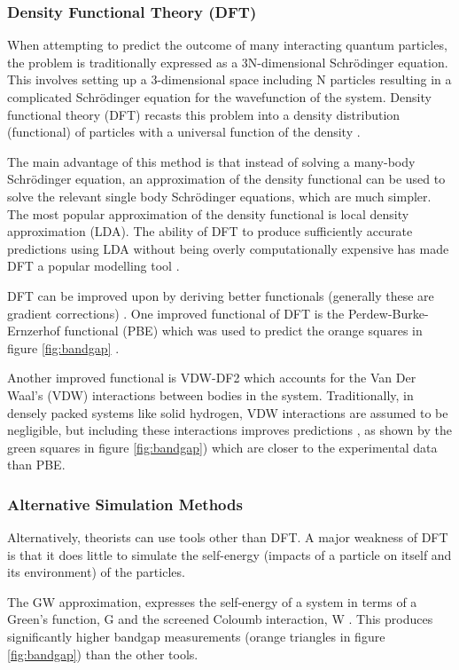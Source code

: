 \documentclass[esp]{FCEFyN-class}
\begin{document}
\subsubsection*{Density Functional Theory (DFT)}

When attempting to predict the outcome of many interacting quantum particles, the problem is traditionally expressed as a 3N-dimensional Schrödinger equation. This involves setting up a 3-dimensional space including N particles resulting in a complicated Schrödinger equation for the wavefunction of the system. Density functional theory (DFT) recasts this problem into a density distribution (functional) of particles with a universal function of the density \cite{Gross2013}.

The main advantage of this method is that instead of solving a many-body Schrödinger equation, an approximation of the density functional can be used to solve the relevant single body Schrödinger equations, which are much simpler. The most popular approximation of the density functional is local density approximation (LDA). The ability of DFT to produce sufficiently accurate predictions using LDA without being overly computationally expensive has made DFT a popular modelling tool \cite{Gross2013}.

DFT can be improved upon by deriving better functionals (generally these are gradient corrections) \cite{Aryasetiawan1998}. One improved functional of DFT is the Perdew-Burke-Ernzerhof functional (PBE) which was used to predict the orange squares in figure \ref{fig:bandgap}  \cite{Bagayoko2014}.

Another improved functional is VDW-DF2 which accounts for the Van Der Waal’s (VDW) interactions between bodies in the system. Traditionally, in densely packed systems like solid hydrogen, VDW interactions are assumed to be negligible, but including these interactions improves predictions \cite{Lee2010} \cite{Berland2015}, as shown by the green squares in figure \ref{fig:bandgap}) which are closer to the experimental data than PBE.


\subsubsection*{Alternative Simulation Methods}
Alternatively, theorists can use tools other than DFT. A major weakness of DFT is that it does little to simulate the self-energy (impacts of a particle on itself and its environment) of the particles. 

The GW approximation, expresses the self-energy of a system in terms of a Green's function, G and the screened Coloumb interaction, W \cite{Aryasetiawan1998}. This produces significantly higher bandgap measurements (orange triangles in figure \ref{fig:bandgap}) than the other tools.
\end{document}

